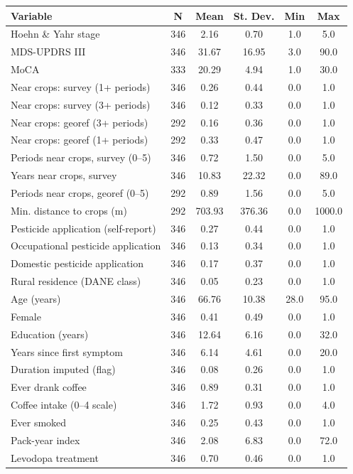 \begin{tabular}{lccccc}
\hline\hline
Variable & N & Mean & St. Dev. & Min & Max \\
\hline
Hoehn \& Yahr stage & 346 & 2.16 & 0.70 & 1.0 & 5.0 \\
MDS-UPDRS III & 346 & 31.67 & 16.95 & 3.0 & 90.0 \\
MoCA & 333 & 20.29 & 4.94 & 1.0 & 30.0 \\
Near crops: survey (1+ periods) & 346 & 0.26 & 0.44 & 0.0 & 1.0 \\
Near crops: survey (3+ periods) & 346 & 0.12 & 0.33 & 0.0 & 1.0 \\
Near crops: georef (3+ periods) & 292 & 0.16 & 0.36 & 0.0 & 1.0 \\
Near crops: georef (1+ periods) & 292 & 0.33 & 0.47 & 0.0 & 1.0 \\
Periods near crops, survey (0--5) & 346 & 0.72 & 1.50 & 0.0 & 5.0 \\
Years near crops, survey & 346 & 10.83 & 22.32 & 0.0 & 89.0 \\
Periods near crops, georef (0--5) & 292 & 0.89 & 1.56 & 0.0 & 5.0 \\
Min. distance to crops (m) & 292 & 703.93 & 376.36 & 0.0 & 1000.0 \\
Pesticide application (self-report) & 346 & 0.27 & 0.44 & 0.0 & 1.0 \\
Occupational pesticide application & 346 & 0.13 & 0.34 & 0.0 & 1.0 \\
Domestic pesticide application & 346 & 0.17 & 0.37 & 0.0 & 1.0 \\
Rural residence (DANE class) & 346 & 0.05 & 0.23 & 0.0 & 1.0 \\
Age (years) & 346 & 66.76 & 10.38 & 28.0 & 95.0 \\
Female & 346 & 0.41 & 0.49 & 0.0 & 1.0 \\
Education (years) & 346 & 12.64 & 6.16 & 0.0 & 32.0 \\
Years since first symptom & 346 & 6.14 & 4.61 & 0.0 & 20.0 \\
Duration imputed (flag) & 346 & 0.08 & 0.26 & 0.0 & 1.0 \\
Ever drank coffee & 346 & 0.89 & 0.31 & 0.0 & 1.0 \\
Coffee intake (0--4 scale) & 346 & 1.72 & 0.93 & 0.0 & 4.0 \\
Ever smoked & 346 & 0.25 & 0.43 & 0.0 & 1.0 \\
Pack-year index & 346 & 2.08 & 6.83 & 0.0 & 72.0 \\
Levodopa treatment & 346 & 0.70 & 0.46 & 0.0 & 1.0 \\
\hline\hline
\end{tabular}
